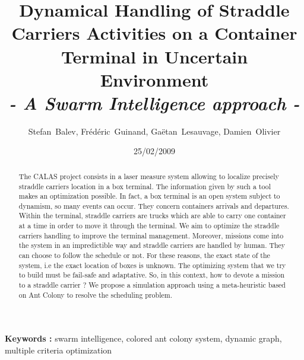 \documentclass[a4paper,10pt]{article}
\date{25/02/2009}
\begin{document}
	\begin{titlepage}
			\title{Dynamical Handling of Straddle Carriers Activities on a Container Terminal in Uncertain Environment \\ \textit{- A Swarm Intelligence approach -}}
		
		\author{Stefan~Balev, Fr\'{e}d\'{e}ric~Guinand, Ga\"{e}tan~Lesauvage, Damien~Olivier}
			
	\end{titlepage}
	\maketitle
	
	\begin{abstract}

	The CALAS project consists in a laser measure system allowing to localize precisely straddle carriers location in a box terminal. The information given by such a tool makes an optimization possible. In fact, a box terminal is an open system subject to dynamism, so many events can occur. They concern containers arrivals and departures. Within the terminal, straddle carriers are trucks which are able to carry one container at a time in order to move it through the terminal. We aim to optimize the straddle carriers handling to improve the terminal management. Moreover, missions come into the system in an impredictible way and straddle carriers are handled by human. They can choose to follow the schedule or not. For these reasons, the exact state of the system, i.e the exact location of boxes is unknown. The optimizing system that we try to build must be fail-safe and adaptative. So, in this context, how to devote a mission to a straddle carrier ? We propose a simulation approach using a meta-heuristic based on Ant Colony to resolve the scheduling problem.
	\\
	\end{abstract}
	

	
	\begin{figure*}[h]
	 
	\textbf{Keywords : } swarm intelligence, colored ant colony system, dynamic graph, multiple criteria optimization
	
	\end{figure*}
\end{document}
